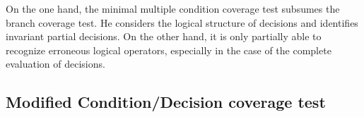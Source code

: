 	On the one hand, the minimal multiple condition coverage test subsumes the branch coverage test. He considers the logical structure of decisions and identifies invariant partial decisions. On the other hand, it is only partially able to recognize erroneous logical operators, especially in the case of the complete evaluation of decisions.

	\subsection{Modified Condition/Decision coverage test}






